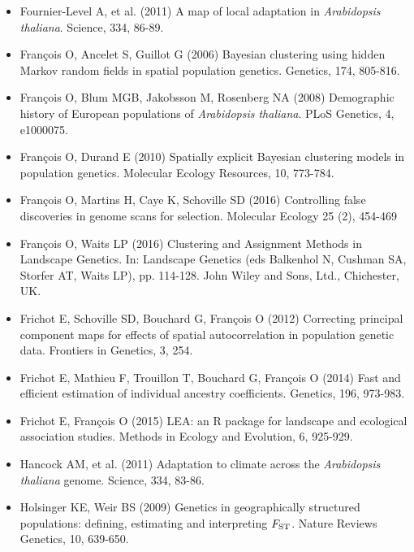 \begin{itemize}
\item[] Fournier-Level A, et al. (2011) A map of local adaptation in {\it Arabidopsis thaliana}. Science, 334, 86-89. 

\item[] Fran\c cois O, Ancelet S, Guillot G (2006) Bayesian clustering using hidden Markov random fields in spatial population genetics. Genetics, 174, 805-816.

\item[] Fran\c cois O, Blum MGB, Jakobsson M, Rosenberg NA (2008) Demographic history of European populations of {\it Arabidopsis thaliana}. PLoS Genetics, 4, e1000075.

\item[] Fran\c cois O, Durand E (2010) Spatially explicit Bayesian clustering models in population genetics. Molecular Ecology Resources, 10, 773-784.

\item[] Fran\c cois O,  Martins H, Caye K, Schoville SD (2016) Controlling false discoveries in genome scans for selection. Molecular Ecology 25 (2), 454-469

\item[] Fran\c cois O,  Waits LP (2016) Clustering and Assignment Methods in Landscape Genetics. In: Landscape Genetics (eds Balkenhol N, Cushman SA, Storfer AT, Waits LP), pp. 114-128. John Wiley and Sons, Ltd., Chichester, UK.

\item[] Frichot E, Schoville SD, Bouchard G, Fran\c cois O (2012) Correcting principal component maps for effects of spatial autocorrelation in population genetic data. Frontiers in Genetics, 3, 254.

\item[] Frichot E, Mathieu F, Trouillon T, Bouchard G, Fran\c cois O (2014) Fast and efficient estimation of individual ancestry coefficients. Genetics, 196, 973-983.

\item[] Frichot E, Fran\c cois O (2015) LEA: an R package for landscape and ecological association studies. Methods in Ecology and Evolution, 6, 925-929.

\item[] Hancock AM, et al. (2011) Adaptation to climate across the {\it Arabidopsis thaliana} genome. Science, 334, 83-86.

\item[] Holsinger KE, Weir BS (2009) Genetics in geographically structured populations: defining, estimating and interpreting $F_{\rm ST}$. Nature Reviews Genetics, 10, 639-650.


\end{itemize}
